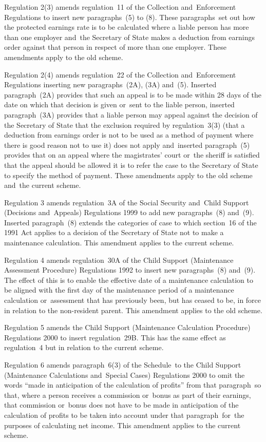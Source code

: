 \documentclass[12pt,a4paper]{article}
\begin{document}
Regulation 2(3) amends regulation~11 of the Collection and~Enforcement Regulations to insert new paragraphs~(5) to (8). These paragraphs~set out how the protected earnings rate is to be calculated where a liable person has more than one employer and~the Secretary of State makes a deduction from earnings order against that person in respect of more than one employer. These amendments apply to the old scheme.

Regulation 2(4) amends regulation~22 of the Collection and~Enforcement Regulations inserting new paragraphs~(2A), (3A) and~(5). Inserted paragraph~(2A) provides that such an appeal is to be made within 28 days of the date on which that decision is given or~sent to the liable person, inserted paragraph~(3A) provides that a liable person may appeal against the decision of the Secretary of State that the exclusion required by regulation~3(3) (that a deduction from earnings order is not to be used as a method of payment where there is good reason not to use it) does not apply and~inserted paragraph~(5) provides that on an appeal where the magistrates’ court or~the sheriff is satisfied that the appeal should be allowed it is to refer the case to the Secretary of State to specify the method of payment. These amendments apply to the old scheme and~the current scheme.

Regulation 3 amends regulation~3A of the Social Security and~Child Support (Decisions and~Appeals) Regulations 1999 to add new paragraphs~(8) and~(9). Inserted paragraph~(8) extends the categories of case to which section~16 of the 1991 Act applies to a decision of the Secretary of State not to make a maintenance calculation. This amendment applies to the current scheme.

Regulation 4 amends regulation~30A of the Child Support (Maintenance Assessment Procedure) Regulations 1992 to insert new paragraphs~(8) and~(9). The effect of this is to enable the effective date of a maintenance calculation to be aligned with the first day of the maintenance period of a maintenance calculation or~assessment that has previously been, but has ceased to be, in force in relation to the non-resident parent. This amendment applies to the old scheme.

Regulation 5 amends the Child Support (Maintenance Calculation Procedure) Regulations 2000 to insert regulation~29B. This has the same effect as regulation~4 but in relation to the current scheme.

Regulation 6 amends paragraph~6(3) of the Schedule~to the Child Support (Maintenance Calculations and~Special Cases) Regulations 2000 to omit the words “made in anticipation of the calculation of profits” from that paragraph~so that, where a person receives a commission or~bonus as part of their earnings, that commission or~bonus does not have to be made in anticipation of the calculation of profits to be taken into account under that paragraph~for~the purposes of calculating net income. This amendment applies to the current scheme.
\end{document}

